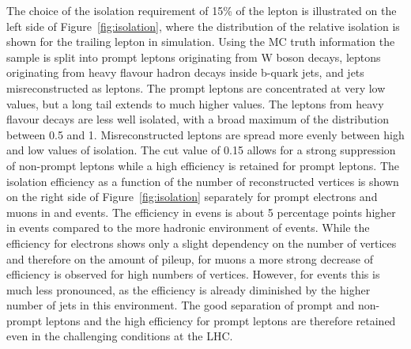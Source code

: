 The choice of the isolation requirement of 15\% of the lepton \pt is illustrated on the left side of Figure~\ref{fig:isolation}, where the distribution of the relative isolation is shown for the trailing lepton in \ttbar simulation. Using the MC truth information the sample is split into prompt leptons originating from W boson decays, leptons originating from heavy flavour hadron decays inside b-quark jets, and jets misreconstructed as leptons. The prompt leptons are concentrated at very low values, but a long tail extends to much higher values. The leptons from heavy flavour decays are less well isolated, with a broad maximum of the distribution between 0.5 and 1. Misreconstructed leptons are spread more evenly between high and low values of isolation. The cut value of 0.15 allows for a strong suppression of non-prompt leptons while a high efficiency is retained for prompt leptons. The isolation efficiency as a function of the number of reconstructed vertices is shown on the right side of Figure~\ref{fig:isolation} separately for prompt electrons and muons in \ttbar and \zjets events. The efficiency in \zjets evens is about 5 percentage points higher in \zjets events compared to the more hadronic environment of \ttbar events. While the efficiency for electrons shows only a slight dependency on the number of vertices and therefore on the amount of pileup, for muons a more strong decrease of efficiency is observed for high numbers of vertices. However, for \ttbar events this is much less pronounced, as the efficiency is already diminished by the higher number of jets in this environment. The good separation of prompt and non-prompt leptons and the high efficiency for prompt leptons are therefore  retained even in the challenging conditions at the LHC. 

